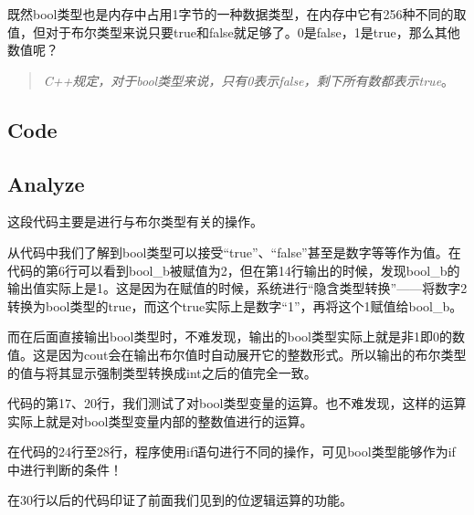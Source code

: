 既然bool类型也是内存中占用1字节的一种数据类型，在内存中它有256种不同的取值，但对于布尔类型来说只要true和false就足够了。0是false，1是true，那么其他数值呢？
\begin{quote}
	\emph{C++规定，对于bool类型来说，只有0表示false，剩下所有数都表示true}。
\end{quote}

\subsection{Code}



\subsection{Analyze}
\showremarks
这段代码主要是进行与布尔类型有关的操作。

从代码中我们了解到bool类型可以接受“true”、“false”甚至是数字等等作为值。在代码的第6行可以看到bool\_b被赋值为2，但在第14行输出的时候，发现bool\_b的输出值实际上是1。这是因为在赋值的时候，系统进行“隐含类型转换”——将数字2转换为bool类型的true，而这个true实际上是数字“1”，再将这个1赋值给bool\_b。

而在后面直接输出bool类型时，不难发现，输出的bool类型实际上就是非1即0的数值。这是因为cout会在输出布尔值时自动展开它的整数形式。所以输出的布尔类型的值与将其显示强制类型转换成int之后的值完全一致。

代码的第17、20行，我们测试了对bool类型变量的运算。也不难发现，这样的运算实际上就是对bool类型变量内部的整数值进行的运算。

在代码的24行至28行，程序使用if语句进行不同的操作，可见bool类型能够作为if中进行判断的条件！

在30行以后的代码印证了前面我们见到的位逻辑运算的功能。

